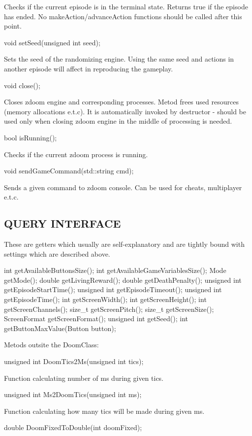 Checks if the current episode is in the terminal state. Returns true if the episode has ended. No makeAction/advanceAction functions should be called after this point.


\vspace{20pt}
\begin{clinee}
	void setSeed(unsigned int seed);
\end{clinee}

Sets the seed of the randomizing engine. Using the same seed and actions in another episode will affect in reproducing the gameplay.


\vspace{20pt}
\begin{clinee}
	void close();
\end{clinee}

Closes zdoom engine and corresponding processes. Metod frees used resources (memory allocations e.t.c). It is automatically invoked by destructor - should be used only when closing zdoom engine in the middle of processing is needed.


\vspace{20pt}
\begin{clinee}
	bool isRunning();
\end{clinee}

Checks if the current zdoom process is running.


\vspace{20pt}
\begin{clinee}
	void sendGameCommand(std::string cmd);
\end{clinee}

Sends a given command to zdoom console. Can be used for cheats, multiplayer e.t.c.


\vspace{20pt}
\subsection{QUERY INTERFACE}
These are getters which usually are self-explanatory and are tightly bound with settings which are described above.
  \begin{clinee}
int getAvailableButtonsSize();
int getAvailableGameVariablesSize();
Mode getMode();
double getLivingReward();
double getDeathPenalty();
unsigned int getEpisodeStartTime();
unsigned int getEpisodeTimeout();
unsigned int getEpisodeTime();
int getScreenWidth();
int getScreenHeight();
int getScreenChannels();
size_t getScreenPitch();
size_t getScreenSize();
ScreenFormat getScreenFormat();
unsigned int getSeed();
int getButtonMaxValue(Button button);
\end{clinee}
Metods outsite the DoomClass:
\begin{clinee}
unsigned int DoomTics2Ms(unsigned int tics);
\end{clinee}
Function calculating number of ms during given tics.
\begin{clinee}
unsigned int Ms2DoomTics(unsigned int ms);
\end{clinee}
Function calculating how many tics will be made during given ms.
\begin{clinee}
double DoomFixedToDouble(int doomFixed);
\end{clinee}


